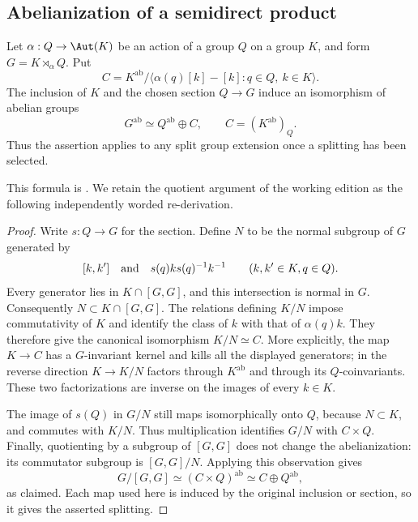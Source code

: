 \subsection{Abelianization of a semidirect product}
\begin{lemma}
\label{wb:lem:semidirect-abelianization}
Let $\alpha:Q\to\Aut(K)$ be an action of a group $Q$ on a group $K$,
and form $G=K\rtimes_\alpha Q$. Put
\[
 C=K^{\mathrm{ab}}/
   \langle\alpha(q)[k]-[k]:q\in Q,\ k\in K\rangle.
\]
The inclusion of $K$ and the chosen section $Q\to G$ induce an
isomorphism of abelian groups
\[
 G^{\mathrm{ab}}\simeq Q^{\mathrm{ab}}\oplus C,
 \qquad C=(K^{\mathrm{ab}})_Q.
 \tag{SD.1}\label{wb:eq:semidirect-abelianization}
\]
Thus the assertion applies to any split group extension once a
splitting has been selected.
\end{lemma}
This formula is \citet[Section~10.5, Lemma~10.7, p.~90]{AC2026}.
We retain the quotient argument of the working edition as the following
independently worded re-derivation.
\begin{proof}
Write $s:Q\to G$ for the section. Define $N$ to be the normal subgroup
of $G$ generated by
\[
 [k,k']\quad\hbox{and}\quad s(q)ks(q)^{-1}k^{-1}
 \qquad(k,k'\in K, q\in Q).
\]
Every generator lies in $K\cap[G,G]$, and this intersection is normal
in $G$. Consequently $N\subset K\cap[G,G]$.
The relations defining $K/N$ impose commutativity of $K$ and identify
the class of $k$ with that of $\alpha(q)k$. They therefore give the
canonical isomorphism $K/N\simeq C$. More explicitly, the map $K\to C$
has a $G$-invariant kernel and kills all the displayed generators;
in the reverse direction $K\to K/N$ factors through $K^{\mathrm{ab}}$
and through its $Q$-coinvariants. These two factorizations are inverse
on the images of every $k\in K$.

The image of $s(Q)$ in $G/N$ still maps isomorphically onto $Q$,
because $N\subset K$, and commutes with $K/N$. Thus multiplication
identifies $G/N$ with $C\times Q$. Finally, quotienting by a subgroup
of $[G,G]$ does not change the abelianization: its commutator subgroup
is $[G,G]/N$. Applying this observation gives
\[
 G/[G,G]\simeq (C\times Q)^{\mathrm{ab}}
              \simeq C\oplus Q^{\mathrm{ab}},
\]
as claimed. Each map used here is induced by the original inclusion
or section, so it gives the asserted splitting.
\end{proof}